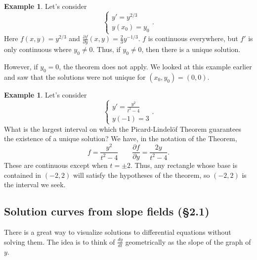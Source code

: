 \documentclass[12pt]{amsart}
\numberwithin{equation}{section}
\theoremstyle{plain} %
\theoremstyle{definition}
\newtheorem{ex}[equation]{Example}
\theoremstyle{remark}
\begin{document}
\begin{ex} Let's consider
\[\begin{cases} y' = y^{2/3} \\ 
y(x_0) = y_0 \end{cases}.\]
Here $f(x,y) = y^{2/3}$ and $\frac{\partial f}{\partial y}(x,y) = \frac23 y^{-1/3}$. $f$ is continuous everywhere, but $f'$ is only continuous where $y_0\neq 0$.
Thus, if $y_0\neq 0$, then there is a unique solution.

However, if $y_0=0$, the theorem does not apply. We looked at this example earlier and saw that the solutions were not unique for $(x_0,y_0) = (0,0)$.
\end{ex}


\begin{ex} Let's consider
\[ \begin{cases} y' = \frac{y^2}{t^2-4} \\
y(-1) = 3 \end{cases}.\]
What is the largest interval on which the Picard-Lindel\"of Theorem guarantees the existence of a unique solution?
We have, in the notation of the Theorem,
\[ f = \frac{y^2}{t^2-4} \qquad \frac{\partial f}{\partial y}=\frac{2y}{t^2-4}.\]
These are continuous except when $t=\pm 2$. Thus, any rectangle whose base is contained in $(-2,2)$ will satisfy the hypotheses of the theorem, so $(-2,2)$ is the interval we seek.
\end{ex}

\subsection*{Solution curves from slope fields (\S 2.1)} There is a great way to visualize solutions to differential equations without solving them. The idea is to think of $\frac{dy}{dt}$ geometrically as the slope of the graph of $y$.
\end{document}
